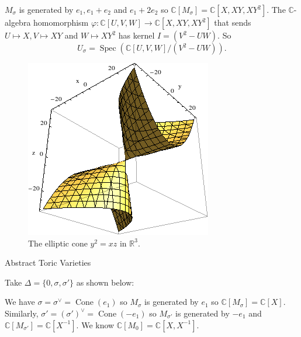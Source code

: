 \documentclass[11pt]{beamer}
\newcommand{\R}{\mathbb{R}}
\newcommand{\C}{\mathbb{C}}
\newcommand{\V}{\vee}
\DeclareMathOperator{\Cone}{Cone}
\DeclareMathOperator{\Spec}{Spec}
\begin{document}
\begin{frame}
$M_{\sigma}$ is generated by $e_1, e_1+e_2$ and $e_1+2e_2$ so $\C[M_{\sigma}] = \C[X,XY,XY^2].$ The $\C$-algebra homomorphism $\varphi: \C[U,V,W]\to \C[X,XY,XY^2]$ that sends $U \mapsto X, V \mapsto XY$ and $W \mapsto XY^2$ has kernel $I= (V^2-UW).$ So $$U_{\sigma} = \Spec \left(\C[U,V,W]/(V^2-UW) \right).$$ 


\begin{figure}[ht]
  \centering
   \includegraphics[scale=0.5,keepaspectratio=true]{./scone.png} \\
    The elliptic cone $y^2=xz$ in $\R^3.$
\end{figure}
\end{frame}

\begin{frame}{Abstract Toric Varieties}
 

\begin{Example}
Take $\Delta = \{0, \sigma, \sigma'\}$ as shown below:
\begin{figure}[ht]
  \centering
\end{figure}

We have $\sigma = \sigma^{\V} = \Cone(e_1)$ so $M_{\sigma}$ is generated by $e_1$ so $\C[M_{\sigma}] = \C[X].$ Similarly, $\sigma' = (\sigma')^{\V} =\Cone(-e_1)$ so $M_{\sigma'}$ is generated by $-e_1$ and $\C[M_{\sigma'}]=\C[X^{-1}].$ We know $\C[M_{0}] = \C[X,X^{-1}].$ 
\end{Example}
\end{frame}
\end{document}

